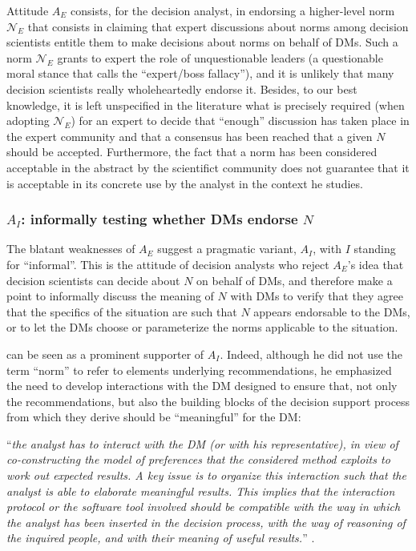 \documentclass[preprint, french, english, 11pt, authoryear]{elsarticle}%
\newcommand{\protectforpdf}[1]{\texorpdfstring{\ensuremath{#1}}{#1}}
\begin{document}
Attitude $A_E$ consists, for the decision analyst, in endorsing a higher-level norm $\mathscr{N}_E$ that consists in claiming that expert discussions about norms among decision scientists entitle them to make decisions about norms on behalf of \acp{DM}. Such a norm $\mathscr{N}_E$ grants to expert the role of unquestionable leaders (a questionable moral stance that \citet{estlund_democratic_2009} calls the ``expert/boss fallacy''), and it is unlikely that many decision scientists really wholeheartedly endorse it. Besides, to our best knowledge, it is left unspecified in the literature what is precisely required (when adopting  $\mathscr{N}_E$) for an expert to decide that “enough” discussion has taken place in the expert community and that a consensus has been reached that a given $N$ should be accepted. Furthermore, the fact that a norm has been considered acceptable in the abstract by the scientifict community does not guarantee that it is acceptable in its concrete use by the analyst in the context he studies.

\subsubsection{\texorpdfstring{$A_I$}{AI}: informally testing whether \acp{DM} endorse \protectforpdf{N}}
The blatant weaknesses of $A_E$ suggest a pragmatic variant, $A_I$, with $I$ standing for “informal”. This is the attitude of decision analysts who reject $A_E$'s idea that decision scientists can decide about $N$ on behalf of \acp{DM}, and therefore make a point to informally discuss the meaning of $N$ with \acp{DM} to verify that they agree that the specifics of the situation are such that $N$ appears endorsable to the \acp{DM}, or to let the \acp{DM} choose or parameterize the norms applicable to the situation.

\citet{roy_multicriteria_1996} can be seen as a prominent supporter of $A_I$. Indeed, although he did not use the term “norm” to refer to elements underlying recommendations, he emphasized the need to develop interactions with the \ac{DM} designed to ensure that, not only the recommendations, but also the building blocks of the decision support process from which they derive should be ``meaningful'' for the \ac{DM}:
\begin{addmargin}[3em]{3em}
 “\emph{the analyst has to interact
with the \ac{DM} (or with his representative), in view of co-constructing the model of preferences that the considered method exploits to work out expected results. A key issue is to organize this interaction such that the analyst is able to
elaborate meaningful results. This implies that the interaction protocol or the
software tool involved should be compatible with the way in which the analyst has
been inserted in the decision process, with the way of reasoning of the inquired
people, and with their meaning of useful results.}” \citep[pp. 84--85]{roy_questions_2013}.
\end{addmargin}
\end{document}
